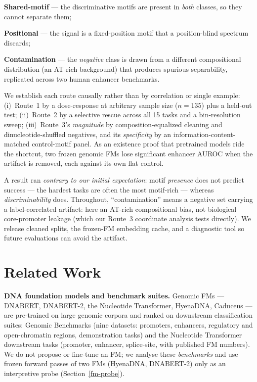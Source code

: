 \documentclass{ws-procs11x85}
\begin{document}
\begin{romanlist}[(iii)]
\item \textbf{Shared-motif} --- the discriminative motifs are present in \emph{both} classes, so they
cannot separate them;
\item \textbf{Positional} --- the signal is a fixed-position motif that a position-blind spectrum
discards;
\item \textbf{Contamination} --- the \emph{negative} class is drawn from a different compositional
distribution (an AT-rich background) that produces spurious separability, replicated across two human
enhancer benchmarks.
\end{romanlist}

We establish each route causally rather than by correlation or single example: (i)~Route~1 by a
dose-response at arbitrary sample size ($n{=}135$) plus a held-out test; (ii)~Route~2 by a selective
rescue across all 15 tasks and a bin-resolution sweep; (iii)~Route~3's \emph{magnitude} by
composition-equalized cleaning and dinucleotide-shuffled negatives, and its \emph{specificity} by an
information-content-matched control-motif panel. As an existence proof that pretrained models ride the
shortcut, two frozen genomic FMs lose significant enhancer AUROC when the artifact is removed, each
against its own flat control.

A result ran \emph{contrary to our initial expectation}: motif \emph{presence} does not predict success
--- the hardest tasks are often the most motif-rich --- whereas \emph{discriminability} does. Throughout,
``contamination'' means a negative set carrying a label-correlated artifact: here an AT-rich compositional
bias, not biological core-promoter leakage (which our Route~3 coordinate analysis tests directly). We
release cleaned splits, the frozen-FM embedding cache, and a diagnostic tool so future evaluations can
avoid the artifact.

\section{Related Work}\label{related-work}

\textbf{DNA foundation models and benchmark suites.} Genomic FMs --- DNABERT\cite{dnabert},
DNABERT-2\cite{dnabert2}, the Nucleotide Transformer\cite{nt}, HyenaDNA\cite{hyenadna},
Caduceus\cite{caduceus} --- are pre-trained on large genomic corpora and ranked on downstream
classification suites: Genomic Benchmarks\cite{gb} (nine datasets: promoters, enhancers, regulatory and
open-chromatin regions, demonstration tasks) and the Nucleotide Transformer downstream tasks\cite{nt}
(promoter, enhancer, splice-site, with published FM numbers). We do not propose or fine-tune an FM; we
analyse these \emph{benchmarks} and use frozen forward passes of two FMs (HyenaDNA, DNABERT-2) only as an
interpretive probe (Section~\ref{fm-probe}).
\end{document}
